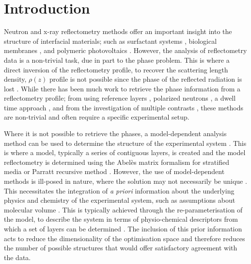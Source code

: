 \documentclass[%
 reprint,
 superscriptaddress,
 amsmath,amssymb,
 aps,
]{revtex4-1}
\begin{document}
\maketitle

\section{\label{intro} Introduction}

Neutron and x-ray reflectometry methods offer an important insight into the structure of interfacial materials; such as surfactant systems \cite{mccluskey_bayesian_2019}, biological membranes \cite{clifton_self_2019}, and polymeric photovoltaics \cite{perez_determination_2019}. 
However, the analysis of reflectometry data is a non-trivial task, due in part to the phase problem. 
This is where a direct inversion of the reflectometry profile, to recover the scattering length density, $\rho(z)$ profile is not possible since the phase of the reflected radiation is lost \cite{majkrzak_exact_1995}.
While there has been much work to retrieve the phase information from a reflectometry profile; from using reference layers \cite{majkrzak_exact_1995,haan_retrieval_1995,majkrzak_phase_2003}, polarized neutrons \cite{leeb_determination_1998}, a dwell time approach \cite{fiedeldey_proposal_1992}, and from the investigation of multiple contrasts \cite{majkrzak_exact_1998,majkrzak_first_2000,majkrzak_phase_2003,koutsioubas_model_2019}, these methods are non-trivial and often require a specific experimental setup. 

Where it is not possible to retrieve the phases, a model-dependent analysis method can be used to determine the structure of the experimental system \cite{pedersen_analysis_1994,haan_genetic_1994,nelson_motofit_2006,lee_comparison_2007,gerelli_aurore_2016,gerelli_aurore_2016b,nelson_refnx_2019}.
This is where a model, typically a series of contiguous layers, is created and the model reflectometry is determined using the Abel\`{e}s matrix formalism for stratified media \cite{abeles_propagation_1948} or Parratt recursive method \cite{parratt_surface_1954}.
However, the use of model-dependent methods is ill-posed in nature, where the solution may not necessarily be unique \cite{klibanov_phaseless_1992,klibanov_use_1994}.
This necessitates the integration of \emph{a priori} information about the underlying physics and chemistry of the experimental system, such as assumptions about molecular volume \cite{waldie_localization_2018,campbell_structure_2018,mccluskey_bayesian_2019}. 
This is typically achieved through the re-parameterisation of the model, to describe the system in terms of physio-chemical descriptors from which a set of layers can be determined \cite{schalke_structural_2000,heinrich_zooming_2014,heinrich_deuteration_2016}. 
The inclusion of this prior information acts to reduce the dimensionality of the optimisation space and therefore reduces the number of possible structures that would offer satisfactory agreement with the data. 
\end{document}
